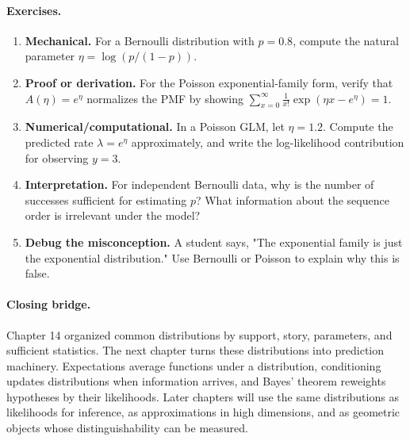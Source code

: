 \paragraph{Exercises.}
\begin{enumerate}[label=\textbf{14.4.\arabic*.}, leftmargin=*]
\item \textbf{Mechanical.} For a Bernoulli distribution with \(p=0.8\), compute the natural parameter \(\eta=\log(p/(1-p))\).
\item \textbf{Proof or derivation.} For the Poisson exponential-family form, verify that \(A(\eta)=e^\eta\) normalizes the PMF by showing \(\sum_{x=0}^\infty \frac{1}{x!}\exp(\eta x-e^\eta)=1\).
\item \textbf{Numerical/computational.} In a Poisson GLM, let \(\eta=1.2\). Compute the predicted rate \(\lambda=e^\eta\) approximately, and write the log-likelihood contribution for observing \(y=3\).
\item \textbf{Interpretation.} For independent Bernoulli data, why is the number of successes sufficient for estimating \(p\)? What information about the sequence order is irrelevant under the model?
\item \textbf{Debug the misconception.} A student says, "The exponential family is just the exponential distribution." Use Bernoulli or Poisson to explain why this is false.
\end{enumerate}

\paragraph{Closing bridge.}
Chapter 14 organized common distributions by support, story, parameters, and sufficient statistics. The next chapter turns these distributions into prediction machinery. Expectations average functions under a distribution, conditioning updates distributions when information arrives, and Bayes' theorem reweights hypotheses by their likelihoods. Later chapters will use the same distributions as likelihoods for inference, as approximations in high dimensions, and as geometric objects whose distinguishability can be measured.

\clearpage
